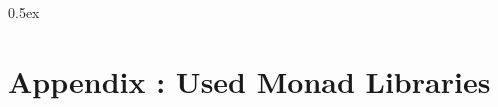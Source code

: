 \documentclass[fontsize=11pt,paper=a4,open=right,twoside,abstract=true]{scrreprt}
\begin{document}
\parindent 0pt\parskip 0.5ex

% 
\newpage

				
\chapter{Appendix : Used Monad Libraries}
				
%				
%	
				

%
%				








\end{document}

